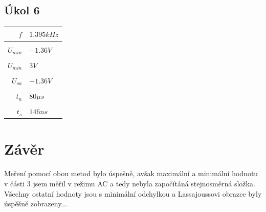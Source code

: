 \documentclass[5pt]{article}
\begin{document}
\subsection{Úkol 6}
\begin{tabular}{r|l}
	$ f $ & $ 1.395 kHz $\\ \hline \\
	$ U_{min} $ & $ -1.36 V $\\ \hline \\
	$ U_{min} $ & $ 3 V $\\ \hline \\
	$ U_{sa} $ & $ -1.36 V $\\ \hline \\
	$ t_n $ & $ 80 \mu s $ \\ \hline \\
	$ t_s $ & $ 146 ns $ \\
\end{tabular}

\section{Závěr}
Meření pomocí obou metod bylo úspešně, avšak maximální a minimální hodnotu v části 3 jsem měřil v režimu AC a tedy nebyla započítáná stejnosměrná složka. Všechny ostatní hodnoty jsou s minimální odchylkou a Lassajoussovi obrazce byly úspěšně zobrazeny...
\end{document}

